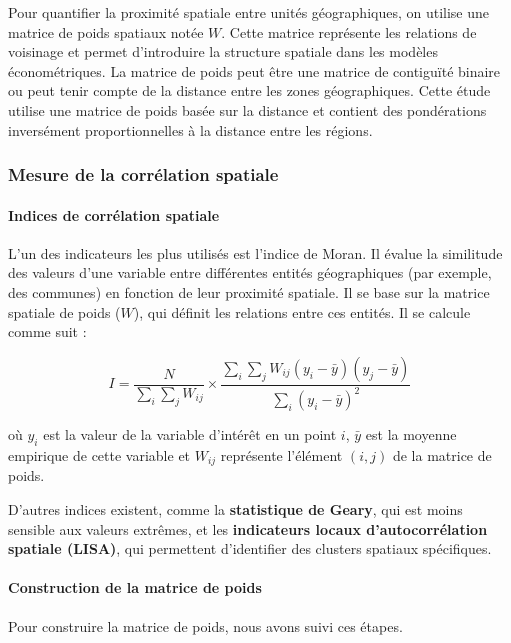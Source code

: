\documentclass[
]{article}
\begin{document}
Pour quantifier la proximité spatiale entre unités géographiques, on
utilise une matrice de poids spatiaux notée \(W\). Cette matrice
représente les relations de voisinage et permet d'introduire la
structure spatiale dans les modèles économétriques. La matrice de poids
peut être une matrice de contiguïté binaire ou peut tenir compte de la
distance entre les zones géographiques. Cette étude utilise une matrice
de poids basée sur la distance et contient des pondérations inversément
proportionnelles à la distance entre les régions.

\subsubsection{Mesure de la corrélation
spatiale}\label{mesure-de-la-corruxe9lation-spatiale}

\paragraph{Indices de corrélation
spatiale}\label{indices-de-corruxe9lation-spatiale}

L'un des indicateurs les plus utilisés est l'indice de Moran. Il évalue
la similitude des valeurs d'une variable entre différentes entités
géographiques (par exemple, des communes) en fonction de leur proximité
spatiale. Il se base sur la matrice spatiale de poids (\(W\)), qui
définit les relations entre ces entités. Il se calcule comme suit :

\[
I = \frac{N}{\sum_{i} \sum_{j} W_{ij}} \times \frac{\sum_{i} \sum_{j} W_{ij} (y_i - \bar{y})(y_j - \bar{y})}{\sum_{i} (y_i - \bar{y})^2}
\]

où \(y_i\) est la valeur de la variable d'intérêt en un point \(i\),
\(\bar{y}\) est la moyenne empirique de cette variable et \(W_{ij}\)
représente l'élément \((i, j)\) de la matrice de poids.

D'autres indices existent, comme la \textbf{statistique de Geary}, qui
est moins sensible aux valeurs extrêmes, et les
\textbf{indicateurs locaux d'autocorrélation spatiale (LISA)}, qui
permettent d'identifier des clusters spatiaux spécifiques.

\paragraph{Construction de la matrice de
poids}\label{construction-de-la-matrice-de-poids}

\hfill\break
Pour construire la matrice de poids, nous avons suivi ces étapes.\\
\end{document}
